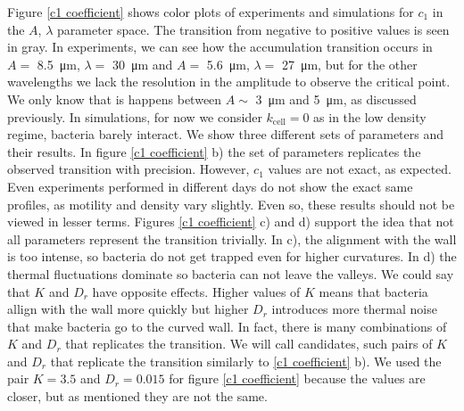 Figure \ref{c1 coefficient} shows color plots of experiments and simulations for $c_1$ in the $A$, $\lambda$ parameter space. The transition from negative to positive values is  seen in gray. In experiments, we can see how the accumulation transition occurs in $A= $ \SI{8.5}{\micro\meter}, $\lambda=$ \SI{30}{\micro\meter} and $A=$ \SI{5.6}{\micro\meter}, $\lambda= $ \SI{27}{\micro\meter}, but for the other wavelengths we lack the resolution in the amplitude to observe the critical point. We only know that is happens between $A\sim$ \SI{3}{\micro\meter} and \SI{5}{\micro\meter}, as discussed previously. In simulations, for now we consider $k_{\text{cell}}=0$ as in the low density regime, bacteria barely interact. We show three different sets of parameters and their results. In figure \ref{c1 coefficient} b) the set of parameters replicates the observed transition with precision. However, $c_1$ values are not exact, as expected. Even experiments performed in different days do not show the exact same profiles, as motility and density vary slightly. Even so, these results should not be viewed in lesser terms. Figures \ref{c1 coefficient} c) and d) support the idea that not all parameters represent the transition trivially. In c), the alignment with the wall is too intense, so bacteria do not get trapped even for higher curvatures. In d) the thermal fluctuations dominate so bacteria can not leave the valleys. We could say that $K$ and $D_r$ have opposite effects. Higher values of $K$ means that bacteria allign with the wall more quickly but higher $D_r$ introduces more thermal noise that make bacteria go to the curved wall. In fact, there is many combinations of $K$ and $D_r$ that replicates the transition. We will call candidates, such pairs of $K$ and $D_r$ that replicate the transition similarly to \ref{c1 coefficient} b). We used the pair $K=3.5$ and $D_r=0.015$ for figure \ref{c1 coefficient} because the values are closer, but as mentioned they are not the same.


